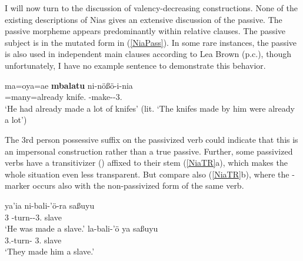 
I will now turn to the discussion of valency-decreasing constructions.
None of the existing descriptions of Nias gives an extensive discussion of the passive. 
The passive morpheme appears predominantly within relative clauses.
The passive subject is in the mutated form in (\ref{NiaPass}). 
In some rare instances, the passive is also used in independent main clauses according to Lea Brown (p.c.), though unfortunately, I have no example sentence to demonstrate this behavior. 

\begin{exe}\ex\label{NiaPass}
\gll ma=oya=ae \textbf{mbalatu} ni-n\"o\ss \"o-i-nia\\
\pfv{}=many=already knife.\mut{} \pass{}-make-\transitiv{}-3\sg{}.\poss{}\\
\glt `He had already made a lot of knifes' (lit. `The knifes made by him were already a lot')
\end{exe}

The 3rd person possessive suffix on the passivized verb could indicate that this is an impersonal construction rather than a true passive.
Further, some passivized verbs have a transitivizer (\transitiv{}) affixed to their stem (\ref{NiaTR}a), which makes the whole situation even less transparent. But compare also (\ref{NiaTR}b), where the \transitiv{}-marker occurs also with the non-passivized form of the same verb. 

\begin{exe}\ex\label{NiaTR}
\begin{xlist}
\ex\gll ya'ia ni-bali-'\"o-ra sa\ss uyu\\
3\sg{} \pass{}-turn-\transitiv{}-3\pl{}.\poss{} slave\\
\glt `He was made a slave.'
\ex\gll la-bali-'\"o ya sa\ss uyu\\
3\pl{}.\rls{}-turn-\transitiv{} 3\sg{}.\mut{} slave\\
\glt `They made him a slave.'
\end{xlist}
\end{exe}

